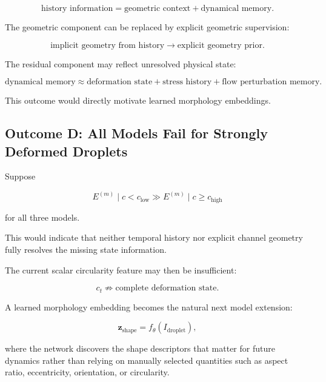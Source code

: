 \documentclass[11pt]{article}
\begin{document}
\begin{equation}
\text{history information}
=
\text{geometric context}
+
\text{dynamical memory}.
\end{equation}

The geometric component can be replaced by explicit geometric supervision:

\begin{equation}
\text{implicit geometry from history}
\longrightarrow
\text{explicit geometry prior}.
\end{equation}

The residual component may reflect unresolved physical state:

\begin{equation}
\text{dynamical memory}
\approx
\text{deformation state}
+
\text{stress history}
+
\text{flow perturbation memory}.
\end{equation}

This outcome would directly motivate learned morphology embeddings.

\subsection{Outcome D: All Models Fail for Strongly Deformed Droplets}

Suppose

\begin{equation}
E^{(m)}
\mid
c<c_{\mathrm{low}}
\gg
E^{(m)}
\mid
c\ge c_{\mathrm{high}}
\end{equation}

for all three models.

This would indicate that neither temporal history nor explicit channel geometry fully resolves the missing state information.

The current scalar circularity feature may then be insufficient:

\begin{equation}
c_t
\not\Rightarrow
\text{complete deformation state}.
\end{equation}

A learned morphology embedding becomes the natural next model extension:

\begin{equation}
\mathbf{z}_{\mathrm{shape}}
=
f_{\theta}
\left(
I_{\mathrm{droplet}}
\right),
\end{equation}

where the network discovers the shape descriptors that matter for future dynamics rather than relying on manually selected quantities such as aspect ratio, eccentricity, orientation, or circularity.
\end{document}
